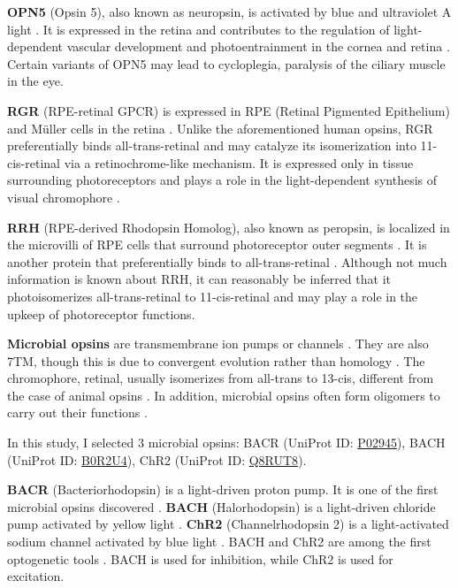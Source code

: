 \documentclass[fleqn, 10pt]{manuscript}
\begin{document}
\textbf{OPN5} (Opsin 5), also known as neuropsin, is activated by blue and ultraviolet A light \citep{Tarttelin_2003}. It is expressed in the retina and contributes to the regulation of light-dependent vascular development and photoentrainment in the cornea and retina \citep{Buhr_2015}. Certain variants of OPN5 may lead to cycloplegia, paralysis of the ciliary muscle in the eye. 

\textbf{RGR} (RPE-retinal GPCR) is expressed in RPE (Retinal Pigmented Epithelium) and M\"uller cells in the retina \citep{Shen_1994}. Unlike the aforementioned human opsins, RGR preferentially binds all-trans-retinal and may catalyze its isomerization into 11-cis-retinal via a retinochrome-like mechanism. It is expressed only in tissue surrounding photoreceptors and plays a role in the light-dependent synthesis of visual chromophore \citep{Radu_2008}.

\textbf{RRH} (RPE-derived Rhodopsin Homolog), also known as peropsin, is localized in the microvilli of RPE cells that surround photoreceptor outer segments \citep{Sun_1997}. It is another protein that preferentially binds to all-trans-retinal \citep{Cook_2017}. Although not much information is known about RRH, it can reasonably be inferred that it photoisomerizes all-trans-retinal to 11-cis-retinal and may play a role in the upkeep of photoreceptor functions. 

\textbf{Microbial opsins} are transmembrane ion pumps or channels \citep{Findlay_1986}. They are also 7TM, though this is due to convergent evolution rather than homology \citep{Yee_2013}. The chromophore, retinal, usually isomerizes from all-trans to 13-cis, different from the case of animal opsins \citep{Findlay_1986}. In addition, microbial opsins often form oligomers to carry out their functions \citep{Gmelin_2007}.

In this study, I selected 3 microbial opsins: BACR (UniProt ID: \href{https://www.uniprot.org/uniprotkb/P02945/entry}{P02945}), BACH (UniProt ID: \href{https://www.uniprot.org/uniprotkb/B0R2U4/entry}{B0R2U4}), ChR2 (UniProt ID: \href{https://www.uniprot.org/uniprotkb/Q8RUT8/entry}{Q8RUT8}). 

\textbf{BACR} (Bacteriorhodopsin) is a light-driven proton pump. It is one of the first microbial opsins discovered \citep{Oesterhelt_1971}. \textbf{BACH} (Halorhodopsin) is a light-driven chloride pump activated by yellow light \citep{Schobert_1982}. \textbf{ChR2} (Channelrhodopsin 2) is a light-activated sodium channel activated by blue light \citep{Nagel_2003}. BACH and ChR2 are among the first optogenetic tools \citep{Zhang_2007, Han_2007}. BACH is used for inhibition, while ChR2 is used for excitation. 
\end{document}
